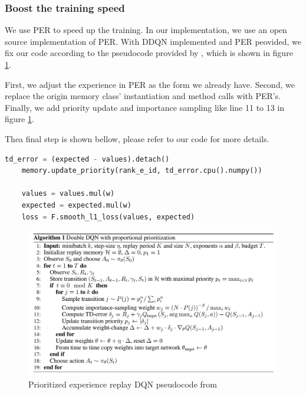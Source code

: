 \documentclass[a4paper, 11pt]{article}
\begin{document}
\subsubsection{Boost the training speed}
We use PER to speed up the training. In our implementation, we use an open source implementation of PER. With DDQN implemented and PER peovided, we fix our code according to the pseudocode provided by \cite{ref4}, which is shown in figure \ref{PER}.

First, we adjust the experience in PER as the form we already have. Second, we replace the origin memory class' instantiation and method calls with PER's. Finally, we add priority update and importance sampling like line 11 to 13 in figure \ref{PER}.

Thea final step is shown bellow, please refer to our code for more details.
\begin{lstlisting}[language={python}]
		td_error = (expected - values).detach()
    memory.update_priority(rank_e_id, td_error.cpu().numpy())

    values = values.mul(w)
    expected = expected.mul(w)
    loss = F.smooth_l1_loss(values, expected)
	\end{lstlisting}
\begin{figure}[ht]
      \centering
      \includegraphics[width = 0.8 \textwidth]{per}
      \caption{Prioritized experience replay DQN pseudocode from \cite{ref4}}
      \label{PER}
\end{figure}
\end{document}
